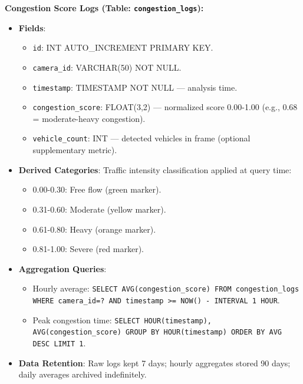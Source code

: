 \textbf{Congestion Score Logs (Table: \texttt{congestion\_logs}):}
\begin{itemize}
    \item \textbf{Fields}:
    \begin{itemize}
        \item \texttt{id}: INT AUTO\_INCREMENT PRIMARY KEY.
        \item \texttt{camera\_id}: VARCHAR(50) NOT NULL.
        \item \texttt{timestamp}: TIMESTAMP NOT NULL — analysis time.
        \item \texttt{congestion\_score}: FLOAT(3,2) — normalized score 0.00-1.00 (e.g., 0.68 = moderate-heavy congestion).
        \item \texttt{vehicle\_count}: INT — detected vehicles in frame (optional supplementary metric).
    \end{itemize}
    \item \textbf{Derived Categories}: Traffic intensity classification applied at query time:
    \begin{itemize}
        \item 0.00-0.30: Free flow (green marker).
        \item 0.31-0.60: Moderate (yellow marker).
        \item 0.61-0.80: Heavy (orange marker).
        \item 0.81-1.00: Severe (red marker).
    \end{itemize}
    \item \textbf{Aggregation Queries}:
    \begin{itemize}
        \item Hourly average: \texttt{SELECT AVG(congestion\_score) FROM congestion\_logs WHERE camera\_id=? AND timestamp >= NOW() - INTERVAL 1 HOUR}.
        \item Peak congestion time: \texttt{SELECT HOUR(timestamp), AVG(congestion\_score) GROUP BY HOUR(timestamp) ORDER BY AVG DESC LIMIT 1}.
    \end{itemize}
    \item \textbf{Data Retention}: Raw logs kept 7 days; hourly aggregates stored 90 days; daily averages archived indefinitely.
\end{itemize}


